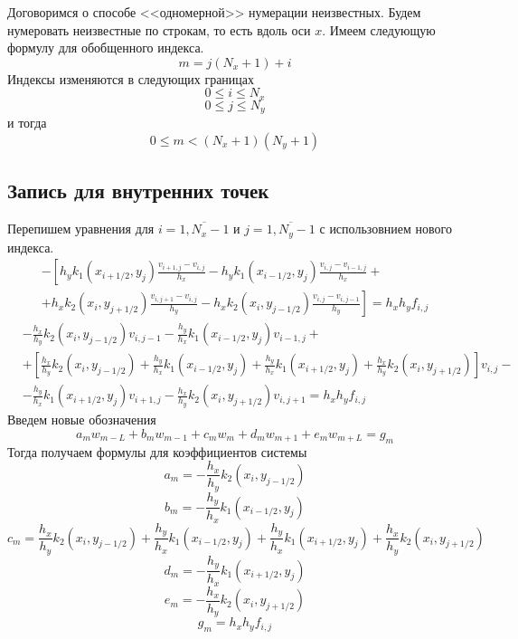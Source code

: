 Договоримся о способе <<одномерной>> нумерации неизвестных.
Будем нумеровать неизвестные по строкам, то есть вдоль оси $x$.
Имеем следующую формулу для обобщенного индекса.
\[ m = j (N_x + 1) + i \]
Индексы изменяются в следующих границах
\[ 0 \leq i \leq N_x \]
\[ 0 \leq j \leq N_y \]
и тогда
\[ 0 \leq m < (N_x + 1) (N_y + 1) \]

\subsection{Запись для внутренних точек}
Перепишем уравнения для $i = \overline{1,N_x-1}$ и $j = \overline{1,N_y-1}$ с использовнием нового индекса.
\begin{multline*}
    - \left[
    h_y k_1(x_{i+1/2},y_{j}) \frac{v_{i+1,j} - v_{i,j}}{h_x} - h_y k_1(x_{i-1/2},y_{j}) \frac{v_{i,j} - v_{i-1,j}}{h_x} + \right. \\
    \left. +
    h_x k_2(x_{i},y_{j+1/2}) \frac{v_{i,j+1} - v_{i,j}}{h_y} - h_x k_2(x_{i},y_{j-1/2}) \frac{v_{i,j} - v_{i,j-1}}{h_y}
    \right] =
    h_x h_y f_{i,j}
\end{multline*}
\[
\begin{split}
    &-\frac{h_x}{h_y} k_2(x_{i},y_{j-1/2}) v_{i,j-1} - \frac{h_y}{h_x} k_1(x_{i-1/2},y_{j}) v_{i-1,j} + \\
    &+\left[ \frac{h_x}{h_y} k_2(x_{i},y_{j-1/2}) + \frac{h_y}{h_x} k_1(x_{i-1/2},y_{j}) + \frac{h_y}{h_x} k_1(x_{i+1/2},y_{j}) + \frac{h_x}{h_y} k_2(x_{i},y_{j+1/2}) \right] v_{i,j} - \\
    &-\frac{h_y}{h_x} k_1(x_{i+1/2},y_{j}) v_{i+1,j} - \frac{h_x}{h_y} k_2(x_{i},y_{j+1/2}) v_{i,j+1} = h_x h_y f_{i,j}
\end{split}
\]
Введем новые обозначения
\[ a_m w_{m - L} + b_m w_{m - 1} + c_m w_m + d_m w_{m + 1} + e_m w_{m + L} = g_m \]
Тогда получаем формулы для коэффициентов системы
\[ a_m = -\frac{h_x}{h_y} k_2(x_{i},y_{j-1/2}) \]
\[ b_m = -\frac{h_y}{h_x} k_1(x_{i-1/2},y_{j}) \]
\[ c_m = \frac{h_x}{h_y} k_2(x_{i},y_{j-1/2}) + \frac{h_y}{h_x} k_1(x_{i-1/2},y_{j}) + \frac{h_y}{h_x} k_1(x_{i+1/2},y_{j}) + \frac{h_x}{h_y} k_2(x_{i},y_{j+1/2}) \]
\[ d_m = -\frac{h_y}{h_x} k_1(x_{i+1/2},y_{j}) \]
\[ e_m = -\frac{h_x}{h_y} k_2(x_{i},y_{j+1/2}) \]
\[ g_m = h_x h_y f_{i,j} \]

